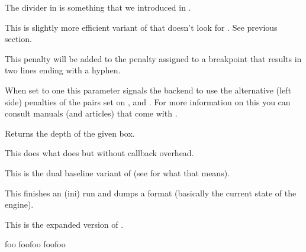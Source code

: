The \type {:} divider in  is something that we introduced in
\LUATEX.

\stopoldprimitive

\startnewprimitive[title={\prm {divideby}}]

This is slightly more efficient variant of  that doesn't look for
. See previous section.

\stopnewprimitive

\startoldprimitive[title={\prm {doublehyphendemerits}}]

This penalty will be added to the penalty assigned to a breakpoint that results
in two lines ending with a hyphen.

\stopoldprimitive

\startnewprimitive[title={\prm {doublepenaltymode}}]

When set to one this parameter signals the backend to use the alternative (left
side) penalties of the pairs set on , 
and . For more information on this you can consult manuals
(and articles) that come with \CONTEXT.

\stopnewprimitive

\startoldprimitive[title={\prm {dp}}]

Returns the depth of the given box.

\stopoldprimitive

\startnewprimitive[title={\prm {dpack}}]

This does what  does but without callback overhead.

\stopnewprimitive

\startnewprimitive[title={\prm {dsplit}}]

This is the dual baseline variant of  (see  for what that
means).

\stopnewprimitive

\startoldprimitive[title={\prm {dump}}]

This finishes an (ini) run and dumps a format (basically the current state of the
engine).

\stopoldprimitive

\startoldprimitive[title={\prm {edef}}]

This is the expanded version of .

\startbuffer
\def \foo{foo}      \meaning\foo
\def \ofo{\foo\foo} \meaning\ofo
\edef\oof{\foo\foo} \meaning\oof
\stopbuffer

